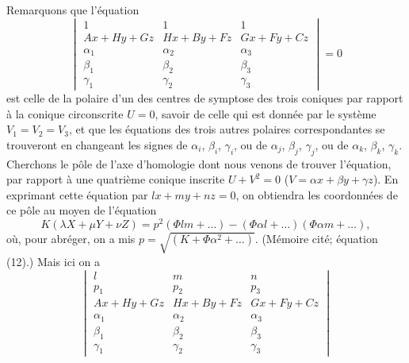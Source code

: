 \documentclass[11pt,a4paper]{book}
\begin{document}
Remarquons que l'\'{e}quation
\begin{equation}\tag{5}
\begin{vmatrix}
1 & 1 & 1 \\
Ax + Hy + Gz & Hx + By + Fz & Gx + Fy + Cz \\
\alpha_1 & \alpha_2 & \alpha_3 \\
\beta_1 & \beta_2 & \beta_3 \\
\gamma_1 & \gamma_2 & \gamma_3
\end{vmatrix} = 0
\end{equation}
est celle de la polaire d'un des centres de symptose des trois coniques par rapport \`{a} la conique circonscrite $U = 0$, savoir de celle qui est donn\'{e}e par le syst\`{e}me $V_1 = V_2 = V_3$, et que les \'{e}quations des trois autres polaires correspondantes se trouveront en changeant les signes de $\alpha_i$, $\beta_i$, $\gamma_i$, ou de $\alpha_j$, $\beta_j$, $\gamma_j$, ou de $\alpha_k$, $\beta_k$, $\gamma_k$.
Cherchons le p\^{o}le de l'axe d'homologie dont nous venons de trouver l'\'{e}quation, par rapport \`{a} une quatri\`{e}me conique inscrite $U + V^2 = 0$ ($V = \alpha x + \beta y + \gamma z$). En exprimant cette \'{e}quation par $lx + my + nz = 0$, on obtiendra les coordonn\'{e}es de ce p\^{o}le au moyen de l'\'{e}quation
\begin{equation}\tag{6}
K(\lambda X + \mu Y + \nu Z) = p^2(\Phi lm + \ldots) - (\Phi \alpha l + \ldots)(\Phi \alpha m + \ldots),
\end{equation}
o\`{u}, pour abr\'{e}ger, on a mis $p = \sqrt{(K + \Phi\alpha^2 + \ldots)}$. (M\'{e}moire cit\'{e}; \'{e}quation (12).) Mais ici on a
\[
\begin{vmatrix}
l & m & n \\
p_1 & p_2 & p_3 \\
Ax + Hy + Gz & Hx + By + Fz & Gx + Fy + Cz \\
\alpha_1 & \alpha_2 & \alpha_3 \\
\beta_1 & \beta_2 & \beta_3 \\
\gamma_1 & \gamma_2 & \gamma_3
\end{vmatrix}
\]
\end{document}
